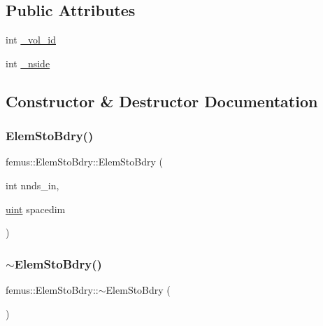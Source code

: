 \subsection*{Public Attributes}
\begin{DoxyCompactItemize}
\item 
int \mbox{\hyperlink{classfemus_1_1_elem_sto_bdry_a5df83163da75a6633d69ba8bb19fced7}{\+\_\+vol\+\_\+id}}
\item 
int \mbox{\hyperlink{classfemus_1_1_elem_sto_bdry_a24ee13b2bdb33a0d2b03f7f820ad2d8b}{\+\_\+nside}}
\end{DoxyCompactItemize}


\subsection{Constructor \& Destructor Documentation}
\mbox{\label{classfemus_1_1_elem_sto_bdry_a5aa20e3da196878003f75eaa7c7385ad}} 
\subsubsection{\texorpdfstring{Elem\+Sto\+Bdry()}{ElemStoBdry()}}
{\footnotesize\ttfamily femus\+::\+Elem\+Sto\+Bdry\+::\+Elem\+Sto\+Bdry (\begin{DoxyParamCaption}\item[{int}]{nnds\+\_\+in,  }\item[{\mbox{\hyperlink{_typedefs_8hpp_a91ad9478d81a7aaf2593e8d9c3d06a14}{uint}}}]{spacedim }\end{DoxyParamCaption})}

\mbox{\label{classfemus_1_1_elem_sto_bdry_a11b920a31ac9d74282a679a46197ba36}} 
\subsubsection{\texorpdfstring{$\sim$\+Elem\+Sto\+Bdry()}{~ElemStoBdry()}}
{\footnotesize\ttfamily femus\+::\+Elem\+Sto\+Bdry\+::$\sim$\+Elem\+Sto\+Bdry (\begin{DoxyParamCaption}{ }\end{DoxyParamCaption})}




